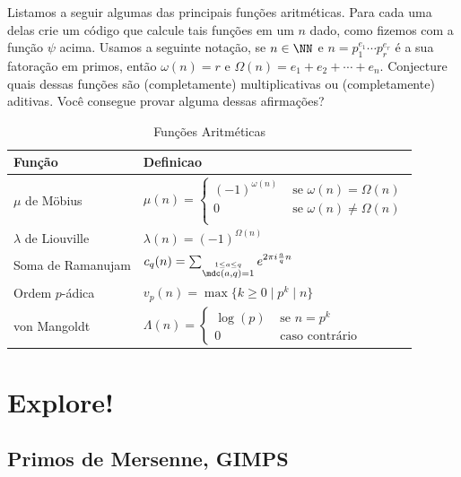 \begin{exercise}
Listamos a seguir algumas das principais funções aritméticas.
Para cada uma delas crie um código que calcule tais funções em
um $n$ dado, como fizemos com a função $\psi$ acima. Usamos 
a seguinte notação, se $n \in \NN$ e $n = p_1^{e_1} \cdots p_r^{e_r}$
é a sua fatoração em primos, então
$\omega(n) = r$ e $\Omega(n) = e_1+e_2+\cdots+e_n$. 
Conjecture quais dessas funções são (completamente) multiplicativas
ou (completamente) aditivas. Você consegue provar alguma dessas afirmações?
\begin{table}
\centering
{\renewcommand{\arraystretch}{2.4}
  \begin{tabular}{|l|l|} \hline
    Função & Definicao \\ \hline \hline
    $\mu$ de Möbius & $\mu(n) = 
      \begin{cases}
        (-1)^{\omega(n)} & \text{ se } \omega(n) = \Omega(n) \\ 
        0 & \text{ se } \omega(n) \neq \Omega(n) \\
      \end{cases}$ \\ \hline
    $\lambda$ de Liouville & $\lambda(n) = (-1)^{\Omega(n)}$ \\ \hline
    Soma de Ramanujam &
      $c_q(n) = \sum_{\stackrel{1 \leq a \leq q}{\mdc(a,q) = 1}}
          e^{2\pi i \frac{a}{q}n}$ \\ \hline
    Ordem $p$-ádica & $v_p(n) = \max\{k \geq 0 \mid p^k \mid n\}$ \\ \hline
    von Mangoldt  & $\Lambda(n) = 
    \begin{cases}
      \log(p) & \text{ se } n = p^k \\
      0 & \text{ caso contrário }
    \end{cases}$ \\ \hline
  \end{tabular}}
  \caption{Funções Aritméticas}
  \label{tab:funarit}
\end{table}
\end{exercise}



\newpage
\section{Explore!}
\label{sec:exploreprimos}
\subsection{Primos de Mersenne, GIMPS}

